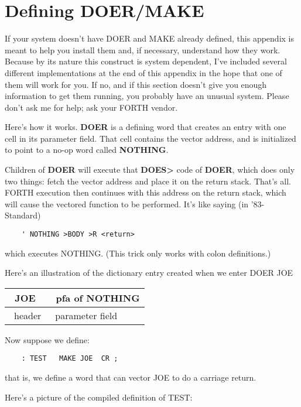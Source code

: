 \chapter{Defining
DOER/MAKE}
If your system doesn't have DOER and MAKE already defined, this appendix
is meant to help you install them and, if necessary, understand
how they work.  Because by its nature this construct is system
dependent, I've included several different implementations at the end of
this appendix in the hope that one of them will work for you.  If no, and if
this section doesn't give you enough information to get them running,
you probably have an unusual system.  Please don't ask me for help; ask
your FORTH vendor.

Here's how it works.  {\bf DOER} is a defining word that creates an entry
with one cell in its parameter field. That cell contains the vector address,
and is initialized to point to a no-op word called {\bf NOTHING}.

Children of {\bf DOER} will execute that {\bf DOES> } code of {\bf DOER}, which
does only two things:  fetch the vector address and place it on the return
stack.  That's all.  FORTH execution then continues with this address on
the return stack, which will cause the vectored function to be performed.
It's like saying (in '83-Standard)
\begin{verbatim}
    ' NOTHING >BODY >R <return>
\end{verbatim}
which executes NOTHING.  (This trick only works with colon definitions.)

Here's an illustration of the dictionary entry created when we enter
DOER JOE 


{\sf
\begin{tabular}{@{} l l@{}}
\hline
\vline\ JOE & \vline\ pfa of NOTHING \vline \\
\hline
\ header &\  parameter field
\end{tabular}
}


Now suppose we define:
\begin{verbatim}
    : TEST   MAKE JOE  CR ;
\end{verbatim}
that is, we define a word that can vector JOE to do a carriage return.

Here's a picture of the compiled definition of TEST:  \\

